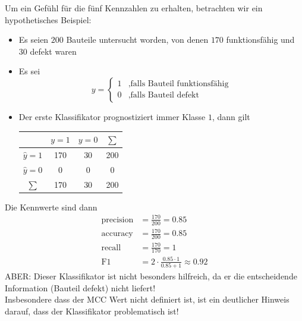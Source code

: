 \begin{frame}
Um ein Gefühl für die fünf Kennzahlen zu erhalten, betrachten wir ein hypothetisches Beispiel:
\begin{itemize}[<+->]
\item Es seien $200$ Bauteile untersucht worden, von denen $170$ funktionsfähig und $30$ defekt waren
\item Es sei \[y = \begin{cases} 1 &,\text{falls Bauteil funktionsfähig} \\ 0 &,\text{falls Bauteil defekt}\end{cases}\]
\item Der erste Klassifikator prognostiziert immer Klasse $1$, dann gilt\\
\begin{center}\begin{tabular}{|c|c|c|c|}
\hline 
 & $ y = 1 $ & $y = 0$ & $\sum$ \\ 
\hline 
$\hat{y} = 1 $& 170 & 30 & 200 \\ 
\hline 
$\hat{y} = 0 $ & 0 & 0 & 0 \\ 
\hline 
$\sum$ & 170 & 30 & 200 \\ 
\hline 
\end{tabular}\end{center}
\end{itemize}
\end{frame}
\begin{frame}
Die Kennwerte sind dann
\begin{align*}
\text{precision} &= \frac{170}{200} = 0.85 \\ \text{accuracy} &= \frac{170}{200} = 0.85 \\
\text{recall} &= \frac{170}{170} = 1 \\ \text{F1} &= 2\cdot \frac{0.85\cdot 1}{0.85+1} \approx 0.92
\end{align*}
\pause
ABER: Dieser Klassifikator ist nicht besonders hilfreich, da er die entscheidende Information (Bauteil defekt) nicht liefert!\\
Insbesondere dass der MCC Wert nicht definiert ist, ist ein deutlicher Hinweis darauf, dass der Klassifikator problematisch ist!
\end{frame}
